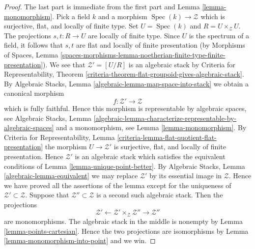 \documentclass[10pt,a4paper]{amsart}
\theoremstyle{plain}
\theoremstyle{definition}
\theoremstyle{remark}
\numberwithin{equation}{subsection}
\def\Spec{\mathop{\mathrm{Spec}}}
\begin{document}
\begin{proof}
The last part is immediate from the first part and
Lemma \ref{lemma-monomorphism}.
Pick a field $k$ and a morphism $\Spec(k) \to \mathcal{Z}$
which is surjective, flat, and locally of finite type.
Set $U = \Spec(k)$ and $R = U \times_\mathcal{Z} U$.
The projections $s, t : R \to U$ are locally of finite type.
Since $U$ is the spectrum of a field, it follows that
$s, t$ are flat and locally of finite presentation (by
Morphisms of Spaces, Lemma
\ref{spaces-morphisms-lemma-noetherian-finite-type-finite-presentation}).
We see that $\mathcal{Z}' = [U/R]$ is an algebraic stack by
Criteria for Representability,
Theorem \ref{criteria-theorem-flat-groupoid-gives-algebraic-stack}.
By
Algebraic Stacks, Lemma \ref{algebraic-lemma-map-space-into-stack}
we obtain a canonical morphism
$$
f : \mathcal{Z}' \longrightarrow \mathcal{Z}
$$
which is fully faithful. Hence this morphism is representable by
algebraic spaces, see
Algebraic Stacks, Lemma
\ref{algebraic-lemma-characterize-representable-by-algebraic-spaces}
and a monomorphism, see
Lemma \ref{lemma-monomorphism}.
By
Criteria for Representability,
Lemma \ref{criteria-lemma-flat-quotient-flat-presentation}
the morphism $U \to \mathcal{Z}'$ is surjective, flat, and locally of finite
presentation. Hence $\mathcal{Z}'$ is an algebraic stack which satisfies
the equivalent conditions of
Lemma \ref{lemma-unique-point-better}.
By
Algebraic Stacks, Lemma \ref{algebraic-lemma-equivalent}
we may replace $\mathcal{Z}'$ by its essential image in $\mathcal{Z}$.
Hence we have proved all the assertions of the lemma except for the
uniqueness of $\mathcal{Z}' \subset \mathcal{Z}$. Suppose that
$\mathcal{Z}'' \subset \mathcal{Z}$ is a second such algebraic stack.
Then the projections
$$
\mathcal{Z}'
\longleftarrow
\mathcal{Z}' \times_\mathcal{Z} \mathcal{Z}''
\longrightarrow
\mathcal{Z}''
$$
are monomorphisms. The algebraic stack in the middle is nonempty by
Lemma \ref{lemma-points-cartesian}.
Hence the two projections are isomorphisms by
Lemma \ref{lemma-monomorphism-into-point}
and we win.
\end{proof}
\end{document}
